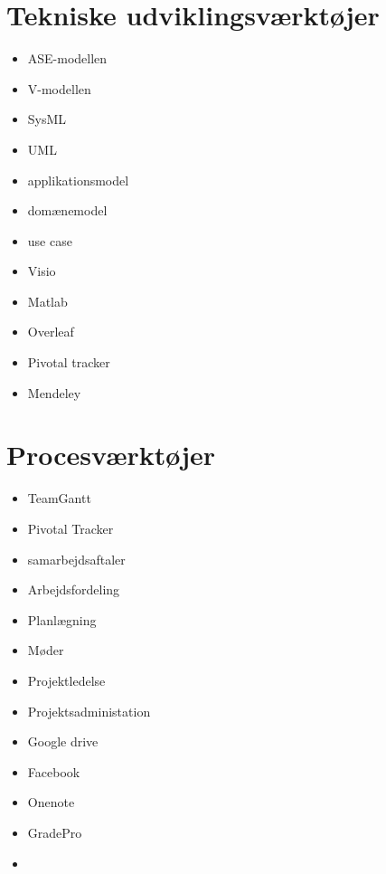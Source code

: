 \section*{Tekniske udviklingsværktøjer}
\begin{itemize}
\item ASE-modellen
\item V-modellen
\item SysML
\item UML
\item applikationsmodel
\item domænemodel
\item use case
\item Visio
\item Matlab
\item Overleaf
\item Pivotal tracker
\item Mendeley
\end{itemize}






\section*{Procesværktøjer}
\begin{itemize}
\item TeamGantt
\item Pivotal Tracker
\item samarbejdsaftaler
\item Arbejdsfordeling
\item Planlægning
\item Møder
\item Projektledelse
\item Projektsadministation
\item Google drive
\item Facebook
\item Onenote
\item GradePro
\item 

\end{itemize}





\cite{Aroom2009}





